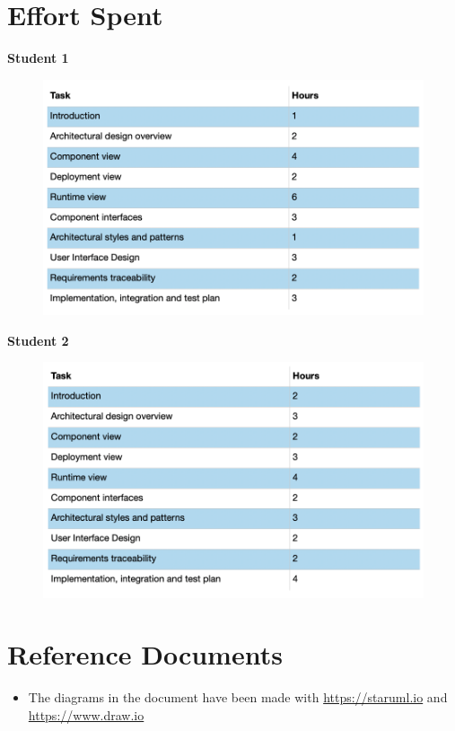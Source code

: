 \documentclass{article}
\begin{document}
\section{Effort Spent}

\textbf{Student 1}

\begin{figure}[H]
  \includegraphics[width=\linewidth]{effort1.png}
  
\end{figure}

\textbf{Student 2}

\begin{figure}[H]
  \includegraphics[width=\linewidth]{effort2.png}
  
\end{figure}

\section{Reference Documents}
\begin{itemize}
\item The diagrams in the document have been made with \url{https://staruml.io} and \url{https://www.draw.io}

\end{itemize}
\end{document}
